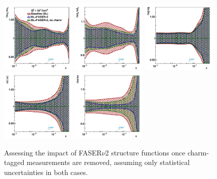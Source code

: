 \begin{figure}[t]
\centering
\includegraphics[width=0.32\textwidth]{plots/proton_fasernu2/inclusive-only_vs_inclusive+charm/statOnly_FASERv2_q2_10000_pdf_uv_ratio.pdf}
\includegraphics[width=0.32\textwidth]{plots/proton_fasernu2/inclusive-only_vs_inclusive+charm/statOnly_FASERv2_q2_10000_pdf_dv_ratio.pdf}
\includegraphics[width=0.32\textwidth]{plots/proton_fasernu2/inclusive-only_vs_inclusive+charm/statOnly_FASERv2_q2_10000_pdf_g_ratio.pdf}\\
\includegraphics[width=0.32\textwidth]{plots/proton_fasernu2/inclusive-only_vs_inclusive+charm/statOnly_FASERv2_q2_10000_pdf_Sea_ratio.pdf}
\includegraphics[width=0.32\textwidth]{plots/proton_fasernu2/inclusive-only_vs_inclusive+charm/statOnly_FASERv2_q2_10000_pdf_s_ratio.pdf}
\caption{Assessing the impact of FASER$\nu$2 structure functions
once charm-tagged measurements are removed, assuming only statistical 
uncertainties in both cases.
}
\label{fig:profiling_charm}
\end{figure}
